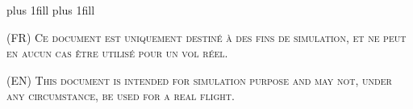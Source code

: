 \thispagestyle{intro}%
%
%
%
%



   



\begin{minipage}[c][\textheight][s]{\linewidth}
\baselineskip plus 1fill %
\lineskip=0pt plus 1fill %


\textsc{{\Huge (FR) Ce document est uniquement destiné à des fins de simulation, et ne peut en aucun cas être utilisé pour un vol réel.}}

\vskip2cm

\textsc{{\Huge (EN) This document is intended for simulation purpose and may not, under any circumstance, be used for a real flight.}}

\end{minipage}





%